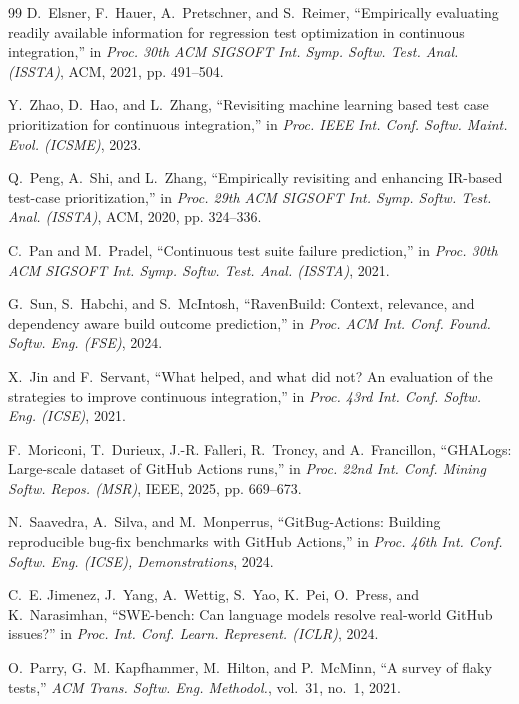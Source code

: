 \documentclass[10pt,conference]{IEEEtran}
\begin{document}
\begin{thebibliography}{99}
D.~Elsner, F.~Hauer, A.~Pretschner, and S.~Reimer, ``Empirically evaluating readily available information for regression test optimization in continuous integration,'' in \emph{Proc. 30th ACM SIGSOFT Int. Symp. Softw. Test. Anal. (ISSTA)}, ACM, 2021, pp. 491--504.

Y.~Zhao, D.~Hao, and L.~Zhang, ``Revisiting machine learning based test case prioritization for continuous integration,'' in \emph{Proc. IEEE Int. Conf. Softw. Maint. Evol. (ICSME)}, 2023.

Q.~Peng, A.~Shi, and L.~Zhang, ``Empirically revisiting and enhancing {IR}-based test-case prioritization,'' in \emph{Proc. 29th ACM SIGSOFT Int. Symp. Softw. Test. Anal. (ISSTA)}, ACM, 2020, pp. 324--336.

C.~Pan and M.~Pradel, ``Continuous test suite failure prediction,'' in \emph{Proc. 30th ACM SIGSOFT Int. Symp. Softw. Test. Anal. (ISSTA)}, 2021.

G.~Sun, S.~Habchi, and S.~McIntosh, ``{RavenBuild}: Context, relevance, and dependency aware build outcome prediction,'' in \emph{Proc. ACM Int. Conf. Found. Softw. Eng. (FSE)}, 2024.

X.~Jin and F.~Servant, ``What helped, and what did not? {An} evaluation of the strategies to improve continuous integration,'' in \emph{Proc. 43rd Int. Conf. Softw. Eng. (ICSE)}, 2021.

F.~Moriconi, T.~Durieux, J.-R. Falleri, R.~Troncy, and A.~Francillon, ``{GHALogs}: Large-scale dataset of {GitHub} {Actions} runs,'' in \emph{Proc. 22nd Int. Conf. Mining Softw. Repos. (MSR)}, IEEE, 2025, pp. 669--673.

N.~Saavedra, A.~Silva, and M.~Monperrus, ``{GitBug-Actions}: Building reproducible bug-fix benchmarks with {GitHub} {Actions},'' in \emph{Proc. 46th Int. Conf. Softw. Eng. (ICSE), Demonstrations}, 2024.

C.~E. Jimenez, J.~Yang, A.~Wettig, S.~Yao, K.~Pei, O.~Press, and K.~Narasimhan, ``{SWE-bench}: Can language models resolve real-world {GitHub} issues?'' in \emph{Proc. Int. Conf. Learn. Represent. (ICLR)}, 2024.

O.~Parry, G.~M. Kapfhammer, M.~Hilton, and P.~McMinn, ``A survey of flaky tests,'' \emph{ACM Trans. Softw. Eng. Methodol.}, vol.~31, no.~1, 2021.


\end{thebibliography}
\end{document}
